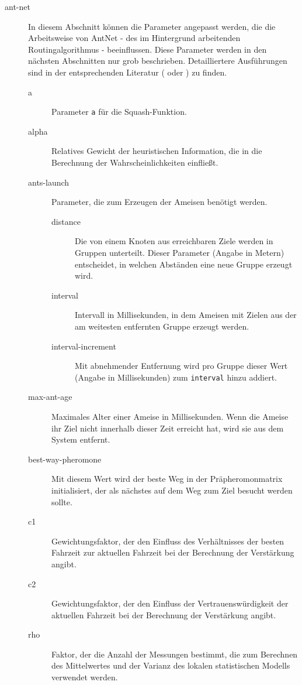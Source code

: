 \begin{description}
  \item[ant-net] In diesem Abschnitt können die Parameter angepasst werden, die die Arbeitsweise von AntNet - des im Hintergrund arbeitenden Routingalgorithmus - beeinflussen.
    Diese Parameter werden in den nächsten Abschnitten nur grob beschrieben.
    Detailliertere Ausführungen sind in der entsprechenden Literatur (\cite{DorigoStuetzle2004} oder \cite{Walther2006}) zu finden.
    \begin{description}
      \item[a] Parameter \texttt{a} für die Squash-Funktion.
      \item[alpha] Relatives Gewicht der heuristischen Information, die in die Berechnung der Wahrscheinlichkeiten einfließt.
      \item[ants-launch] Parameter, die zum Erzeugen der Ameisen benötigt werden.
        \begin{description}
          \item[distance] Die von einem Knoten aus erreichbaren Ziele werden in Gruppen unterteilt.
            Dieser Parameter (Angabe in Metern) entscheidet, in welchen Abständen eine neue Gruppe erzeugt wird.
          \item[interval] Intervall in Millisekunden, in dem Ameisen mit Zielen aus der am weitesten entfernten Gruppe erzeugt werden.
          \item[interval-increment] Mit abnehmender Entfernung wird pro Gruppe dieser Wert (Angabe in Millisekunden) zum \texttt{interval} hinzu addiert.
        \end{description}
      \item[max-ant-age] Maximales Alter einer Ameise in Millisekunden.
        Wenn die Ameise ihr Ziel nicht innerhalb dieser Zeit erreicht hat, wird sie aus dem System entfernt.
      \item[best-way-pheromone] Mit diesem Wert wird der beste Weg in der Präpheromonmatrix initialisiert, der als nächstes auf dem Weg zum Ziel besucht werden sollte.
      \item[c1] Gewichtungsfaktor, der den Einfluss des Verhältnisses der besten Fahrzeit zur aktuellen Fahrzeit bei der Berechnung der Verstärkung angibt.
      \item[c2] Gewichtungsfaktor, der den Einfluss der Vertrauenswürdigkeit der aktuellen Fahrzeit bei der Berechnung der Verstärkung angibt.
      \item[rho] Faktor, der die Anzahl der Messungen bestimmt, die zum Berechnen des Mittelwertes und der Varianz des lokalen statistischen Modells verwendet werden.

\end{description}
\end{description}

